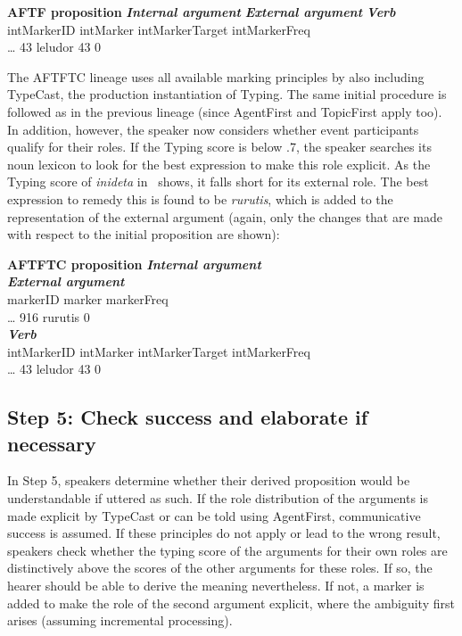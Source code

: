 \documentclass[output=paper]{LSP/langsci}
\begin{document}
\ea \label{17-le-ex:9-AFTF}
\textbf{AFTF proposition}
\ea \textit{\textbf{Internal argument}}
\ex \textit{\textbf{External argument}}
\ex \textit{\textbf{Verb}}\\
\gll {\ldots} intMarkerID intMarker intMarkerTarget intMarkerFreq\\
{\ldots} 43 leludor 43 0\\
\z
\z

 The AFTFTC lineage uses all available marking principles by also including TypeCast, the production instantiation of Typing. The same initial procedure is followed as in the previous lineage (since AgentFirst and TopicFirst apply too). In addition, however, the speaker now considers whether event participants qualify for their roles. If the Typing score is below .7, the speaker searches its noun lexicon to look for the best expression to make this role explicit. As the Typing score of \textit{inideta} in~ shows, it falls short for its external role. The best expression to remedy this is found to be \textit{rurutis}, which is added to the representation of the external argument (again, only the changes that are made with respect to the initial proposition are shown):

\ea  \label{17-le-ex:10-AFTFTC}
\textbf{AFTFTC proposition}\small
\ea\label{TypingProp}
\textit{\textbf{Internal argument}}\\

\ex \textit{\textbf{External argument}}\\
\gll {\ldots} markerID marker markerFreq\\
{\ldots} 916 rurutis 0\\

\ex \textit{\textbf{Verb}}\\
\gll  {\ldots} intMarkerID intMarker intMarkerTarget intMarkerFreq\\
{\ldots} 43 leludor 43 0\\
\z
\z

\subsection{Step 5: Check success and elaborate if necessary}\label{17-le-sec:Elaborate}
In Step 5, speakers determine whether their derived proposition would be understandable if uttered as such. If the role distribution of the arguments is made explicit by TypeCast or can be told using AgentFirst, communicative success is assumed. 
If these principles do not apply or lead to the wrong result, speakers check whether the typing score of the arguments for their own roles are distinctively above the scores of the other arguments for these roles. If so, the hearer should be able to derive the meaning nevertheless. If not, a marker is added to make the role of the second argument explicit, where the ambiguity first arises (assuming incremental processing). 
\end{document}
